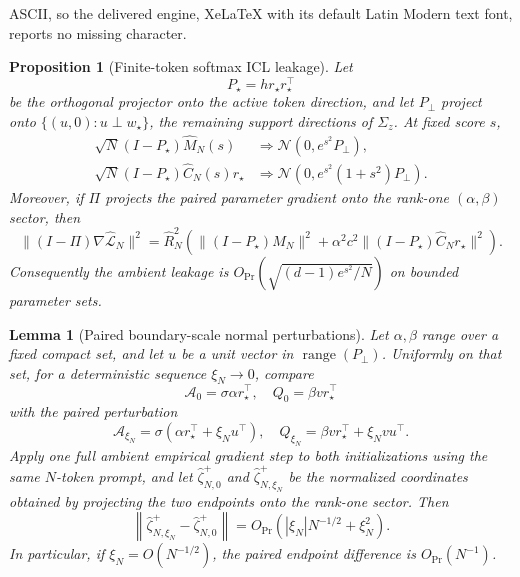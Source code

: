 \documentclass[10pt,a4paper]{amsart}
\newtheorem{lemma}[theorem]{Lemma}
\newtheorem{proposition}[theorem]{Proposition}
\begin{document}
ASCII, so the delivered engine, XeLaTeX with its default Latin Modern text font, reports no missing character.
\begin{proposition}[Finite-token softmax ICL leakage]
\label{prop:softmax-leakage}
Let
\[
P_\star=hr_\star r_\star^\top
\]
be the orthogonal projector onto the active token direction, and let
\(P_\perp\) project onto
\(\{(u,0):u\perp w_\star\}\), the remaining support directions of
\(\Sigma_z\).  At fixed score \(s\),
\begin{align}
\sqrt N(I-P_\star)\widehat M_N(s)
&\Rightarrow
\mathcal N\!\left(0,e^{s^2}P_\perp\right),\label{eq:softmax-mean-leakage}\\
\sqrt N(I-P_\star)\widehat C_N(s)r_\star
&\Rightarrow
\mathcal N\!\left(0,e^{s^2}(1+s^2)P_\perp\right).
\label{eq:softmax-cov-leakage}
\end{align}
Moreover, if \(\Pi\) projects the paired parameter gradient onto the
rank-one \((\alpha,\beta)\) sector, then
\begin{equation}
\label{eq:softmax-gradient-leakage}
\|(I-\Pi)\nabla\widehat{\mathcal L}_N\|^2
=
\widehat R_N^2
\left(
\|(I-P_\star)\widehat M_N\|^2
+\alpha^2c^2\|(I-P_\star)\widehat C_Nr_\star\|^2
\right).
\end{equation}
Consequently the ambient leakage is
\(O_{\Pr}(\sqrt{(d-1)e^{s^2}/N})\) on bounded parameter sets.
\end{proposition}

\begin{lemma}[Paired boundary-scale normal perturbations]
\label{lem:softmax-paired-perturbation}
Let \(\alpha,\beta\) range over a fixed compact set, and let \(u\) be a unit
vector in \(\operatorname{range}(P_\perp)\).  Uniformly on that set, for a
deterministic sequence \(\xi_N\to0\), compare
\[
\mathcal A_{0}=\sigma\alpha r_\star^\top,\quad
Q_{0}=\beta vr_\star^\top
\]
with the paired perturbation
\[
\mathcal A_{\xi_N}
=\sigma(\alpha r_\star^\top+\xi_Nu^\top),\quad
Q_{\xi_N}
=\beta vr_\star^\top+\xi_Nvu^\top.
\]
Apply one full ambient empirical gradient step to both initializations using
the same \(N\)-token prompt, and let
\(\widehat\zeta^+_{N,0}\) and
\(\widehat\zeta^+_{N,\xi_N}\) be the normalized coordinates obtained by
projecting the two endpoints onto the rank-one sector.  Then
\[
\left\|
\widehat\zeta^+_{N,\xi_N}
-\widehat\zeta^+_{N,0}
\right\|
=O_{\Pr}\!\left(
|\xi_N|N^{-1/2}+\xi_N^2
\right).
\]
In particular, if \(\xi_N=O(N^{-1/2})\), the paired endpoint difference is
\(O_{\Pr}(N^{-1})\).
\end{lemma}
\end{document}

